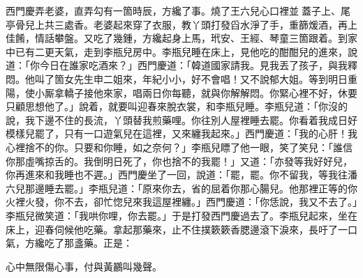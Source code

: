 西門慶弄老婆，直弄勾有一箇時辰，方纔了事。燒了王六兒心口裡並𣬼蓋子上、尾亭骨兒上共三處香。老婆起來穿了衣服，教丫頭打發舀水淨了手，重篩煖酒，再上佳餚，情話攀盤。又吃了幾鍾，方纔起身上馬，玳安、王經、琴童三箇跟着。到家中已有二更天氣，走到李瓶兒房中。李瓶兒睡在床上，見他吃的酣酣兒的進來，說道：「你今日在誰家吃酒來？」西門慶道：「韓道國家請我。見我丟了孩子，與我釋悶。他叫了箇女先生申二姐來，年紀小小，好不會唱！又不說郁大姐。等到明日重陽，使小厮拿轎子接他來家，唱兩日你每聽，就與你解解悶。你緊心裡不好，休要只顧思想他了。」{}說着，就要叫迎春來脫衣裳，和李瓶兒睡。李瓶兒道：「你沒的說，我下邊不住的長流，丫頭替我煎藥哩。你往別人屋裡睡去罷。你看着我成日好模樣兒罷了，只有一口遊氣兒在這裡，又來纏我起來。」西門慶道：「我的心肝！我心裡捨不的你。只要和你睡，如之奈何？」李瓶兒瞟了他一眼，笑了笑兒：「誰信你那虛嘴掠舌的。我倒明日死了，你也捨不的我罷！」又道：「亦發等我好好兒，你再進來和我睡也不遲。」西門慶坐了一回，說道：「罷，罷。你不留我，等我往潘六兒那邊睡去罷。」李瓶兒道：「原來你去，省的屈着你那心腸兒。他那裡正等的你火裡火發，你不去，卻忙惚兒來我這屋裡纏。」{}西門慶道：「你恁說，我又不去了。」李瓶兒微笑道：「我哄你哩，你去罷。」于是打發西門慶過去了。李瓶兒起來，坐在床上，迎春伺候他吃藥。拿起那藥來，止不住撲簌簌香腮邊滾下淚來，長吁了一口氣，{}方纔吃了那盞藥。正是：

\begin{myquote}
心中無限傷心事，付與黃鸝叫幾聲。
\end{myquote}

